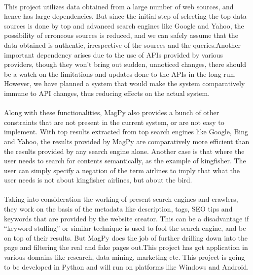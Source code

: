\documentclass[a4paper]{report}
\begin{document}
\paragraph{}
\large\textnormal{This project utilizes data obtained from a large number of web sources, and hence has large dependencies. But since the initial step of selecting the top data sources is done by top and advanced search engines like Google and Yahoo, the possibility of erroneous sources is reduced, and we can safely assume that the data obtained is authentic, irrespective of the sources and the queries.Another important dependency arises due to the use of APIs provided by various providers, though they won’t bring out sudden, unnoticed changes, there should be a watch on the limitations and updates done to the APIs in the long run. However, we have planned a system that would make the system comparatively immune to API changes, thus reducing effects on the actual system.}

\paragraph{}
\large\textnormal{Along with these functionalities, MagPy also provides a bunch of other constraints that
are not present in the current system, or are not easy to implement. With top results extracted from top search engines like Google, Bing and Yahoo, the results provided by MagPy are comparatively more efficient than the results provided by any search engine alone. Another case is that where the user needs to search for contents semantically, as the example of kingfisher. The user can simply specify a negation of the term airlines to imply that what the user needs is not about kingfisher airlines, but about the bird.}

\paragraph{}
\large\textnormal{Taking into consideration the working of present search engines and crawlers, they work
on the basis of the metadata like description, tags, SEO tips and keywords that are provided by the website creator. This can be a disadvantage if “keyword stuffing” or similar technique is used to fool the search engine, and be on top of their results. But MagPy does the job of further drilling down into the page and filtering the real and fake pages out.This project has got application in various domains like research, data mining, marketing etc. This project is going to be developed in Python and will run on platforms like Windows and Android.}
\end{document}
